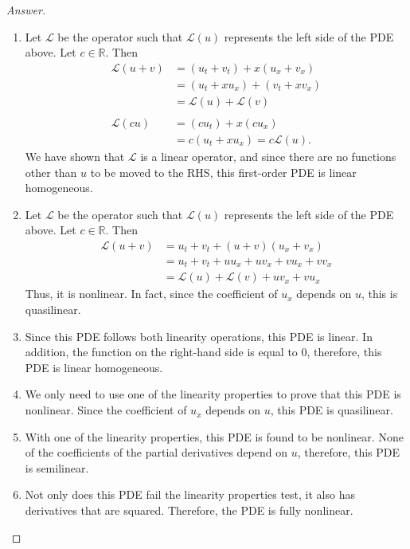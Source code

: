 \documentclass{article}
\theoremstyle{definition}
\renewcommand\qedsymbol{$\blacksquare$}
\newenvironment{ans}{\begin{proof}[Answer]\renewcommand{\qedsymbol}{}}{\end{proof}}
\begin{document}
	\begin{ans}
		\begin{enumerate}[(1), series=answers]
			
			\item Let $\mathcal{L}$ be the  operator such that $\mathcal{L}(u)$ represents the left side of the PDE above. Let $c\in\mathbb{R}$. Then
			\begin{align*}
				\mathcal{L}(u+v) &= (u_t + v_t) + x(u_x + v_x)\\
				&= (u_t + xu_x) + (v_t + xv_x)\\
				&= \mathcal{L}(u) + \mathcal{L}(v)\\\\
				\mathcal{L}(cu) &= (cu_t) + x(cu_x)\\
				&=c(u_t + xu_x) = c\mathcal{L}(u).
			\end{align*}
			We have shown that $\mathcal{L}$ is a linear operator, and since there are no functions other than $u$ to be moved to the RHS, this first-order PDE is linear homogeneous.
			
			\item Let $\mathcal{L}$ be the  operator such that $\mathcal{L}(u)$ represents the left side of the PDE above. Let $c\in\mathbb{R}$. Then
			\begin{align*}
				\mathcal{L}(u+v) &= u_t + v_t + (u+v)(u_x + v_x)\\
				&= u_t + v_t + uu_x + uv_x + vu_x + vv_x\\
				&= \mathcal{L}(u) + \mathcal{L}(v) + uv_x + vu_x
			\end{align*}
			Thus, it is nonlinear. In fact, since the coefficient of $u_x$ depends on $u$, this is quasilinear.
			
			\item Since this PDE follows both linearity operations, this PDE is linear. In addition, the function on the right-hand side is equal to 0, therefore, this PDE is linear homogeneous.
			
			\item We only need to use one of the linearity properties to prove that this PDE is nonlinear. Since the coefficient of $u_x$ depends on $u$, this PDE is quasilinear.
			
			\item With one of the linearity properties, this PDE is found to be nonlinear. None of the coefficients of the partial derivatives depend on $u$, therefore, this PDE is semilinear.
			
			\item Not only does this PDE fail the linearity properties test, it also has derivatives that are squared. Therefore, the PDE is fully nonlinear.
			

\end{enumerate}
\end{ans}
\end{document}
